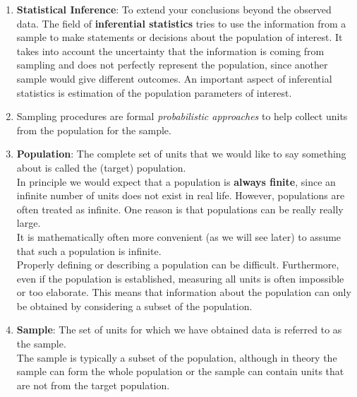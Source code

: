 \begin{enumerate}
    \item \textbf{Statistical Inference}\label{Sampling Plans/Statistical Inference}: To extend your conclusions beyond the observed data. 
    The field of \textbf{inferential statistics} tries to use the information from a sample to make statements or decisions about the population of interest. 
    It takes into account the uncertainty that the information is coming from sampling and does not perfectly represent the population, since another sample would give different outcomes. 
    An important aspect of inferential statistics is estimation of the population parameters of interest.
    \hfill \cite{statistics/book/Statistics-for-Data-Scientists/Maurits-Kaptein}

    \item Sampling procedures are formal \textit{probabilistic approaches} to help collect units from the population for the sample.
    \hfill \cite{statistics/book/Statistics-for-Data-Scientists/Maurits-Kaptein}

    \item \textbf{Population}\label{Sampling Plans/Population}: The complete set of units that we would like to say something about is called the (target) population.
    \hfill \cite{statistics/book/Statistics-for-Data-Scientists/Maurits-Kaptein}
    \\
    In principle we would expect that a population is \textbf{always finite}, since an infinite number of units does not exist in real life. However, populations are often treated as infinite. One reason is that populations can be really really large.
    \hfill \cite{statistics/book/Statistics-for-Data-Scientists/Maurits-Kaptein}
    \\
    It is mathematically often more convenient (as we will see later) to assume that such a population is infinite.
    \hfill \cite{statistics/book/Statistics-for-Data-Scientists/Maurits-Kaptein}
    \\
    Properly defining or describing a population can be difficult. Furthermore, even if the population is established, measuring all units is often impossible or too elaborate. This means that information about the population can only be obtained by considering a subset of the population.
    \hfill \cite{statistics/book/Statistics-for-Data-Scientists/Maurits-Kaptein}

    \item \textbf{Sample}\label{Sampling Plans/Sample}: The set of units for which we have obtained data is referred to as the sample. 
    \hfill \cite{statistics/book/Statistics-for-Data-Scientists/Maurits-Kaptein}
    \\
    The sample is typically a subset of the population, although in theory the sample can form the whole population or the sample can contain units that are not from the target population. 
    \hfill \cite{statistics/book/Statistics-for-Data-Scientists/Maurits-Kaptein}


\end{enumerate}
